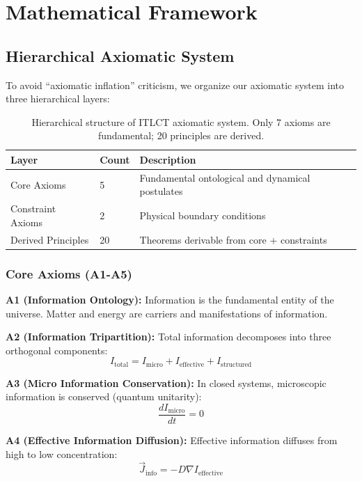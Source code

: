 \documentclass[12pt,a4paper]{article}
\begin{document}
\section{Mathematical Framework}

\subsection{Hierarchical Axiomatic System}

To avoid ``axiomatic inflation'' criticism, we organize our axiomatic system into three hierarchical layers:

\begin{table}[h]
\centering
\begin{tabular}{@{}lll@{}}
\toprule
\textbf{Layer} & \textbf{Count} & \textbf{Description} \\
\midrule
Core Axioms & 5 & Fundamental ontological and dynamical postulates \\
Constraint Axioms & 2 & Physical boundary conditions \\
Derived Principles & 20 & Theorems derivable from core + constraints \\
\bottomrule
\end{tabular}
\caption{Hierarchical structure of ITLCT axiomatic system. Only 7 axioms are fundamental; 20 principles are derived.}
\end{table}

\subsubsection{Core Axioms (A1-A5)}

\textbf{A1 (Information Ontology):} Information is the fundamental entity of the universe. Matter and energy are carriers and manifestations of information.

\textbf{A2 (Information Tripartition):} Total information decomposes into three orthogonal components:
\begin{equation}
I_{\text{total}} = I_{\text{micro}} + I_{\text{effective}} + I_{\text{structured}}
\end{equation}

\textbf{A3 (Micro Information Conservation):} In closed systems, microscopic information is conserved (quantum unitarity):
\begin{equation}
\frac{dI_{\text{micro}}}{dt} = 0
\end{equation}

\textbf{A4 (Effective Information Diffusion):} Effective information diffuses from high to low concentration:
\begin{equation}
\vec{J}_{\text{info}} = -D \nabla I_{\text{effective}}
\end{equation}
\end{document}
